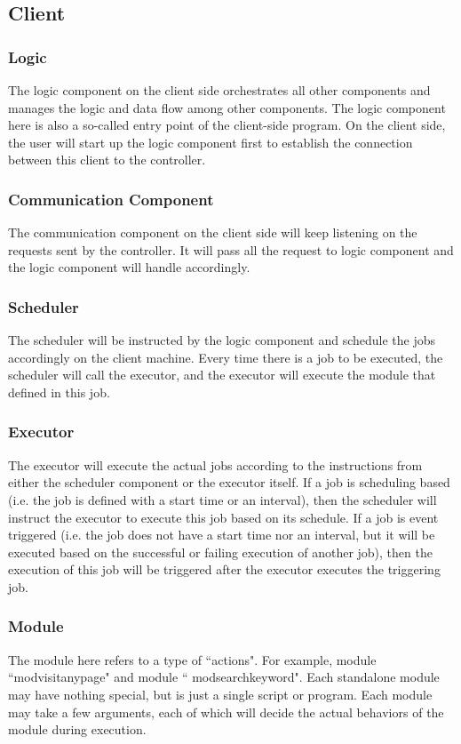 \documentclass[12pt]{report}
\begin{document}
\subsection{Client}

\subsubsection{Logic}
The logic component on the client side orchestrates all other components and manages the logic and data flow among other components. The logic component here is also a so-called entry point of the client-side program. On the client side, the user will start up the logic component first to establish the connection between this client to the controller.

\subsubsection{Communication Component}
The communication component on the client side will keep listening on the requests sent by the controller. It will pass all the request to logic component and the logic component will handle accordingly. 

\subsubsection{Scheduler}
The scheduler will be instructed by the logic component and schedule the jobs accordingly on the client machine. Every time there is a job to be executed, the scheduler will call the executor, and the executor will execute the module that defined in this job.

\subsubsection{Executor}
The executor will execute the actual jobs according to the instructions from either the scheduler component or the executor itself. If a job is scheduling based (i.e. the job is defined with a start time or an interval), then the scheduler will instruct the executor to execute this job based on its schedule. If a job is event triggered (i.e. the job does not have a start time nor an interval, but it will be executed based on the successful or failing execution of another job), then the execution of this job will be triggered after the executor executes the triggering job. 

\subsubsection{Module}
The module here refers to a type of ``actions". For example, module ``mod\textunderscore visit\textunderscore any\textunderscore page" and module `` mod\textunderscore search\textunderscore keyword". Each standalone module may have nothing special, but is just a single script or program. Each module may take a few arguments, each of which will decide the actual behaviors of the module during execution. 
\end{document}
